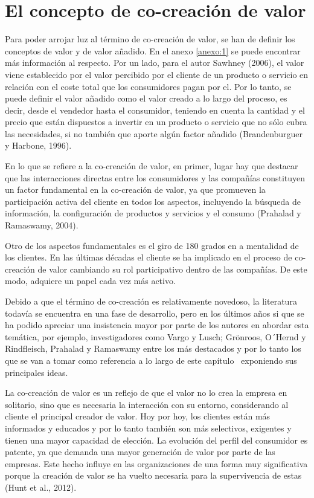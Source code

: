\section{El concepto de co-creación de valor} 

Para poder arrojar luz al término de co-creación de valor, se han de definir los conceptos de valor y de valor añadido. En el anexo \ref{anexo:1} se puede encontrar más información al respecto. Por un lado, para el autor Sawhney (2006), el valor viene establecido por el valor percibido por el cliente de un producto o servicio en relación con el coste total que los consumidores pagan por el. Por lo tanto, se puede definir el valor añadido como el valor creado a lo largo del proceso, es decir, desde el vendedor hasta el consumidor, teniendo en cuenta la cantidad y el precio que están dispuestos a invertir en un producto o servicio que no sólo cubra las necesidades, si no también que aporte algún factor añadido (Brandenburguer y Harbone, 1996). 


En lo que se refiere a la co-creación de valor, en primer, lugar hay que destacar que las interacciones directas entre los consumidores y las compañías constituyen un factor fundamental en la co-creación de valor, ya que promueven la participación activa del cliente en todos los aspectos, incluyendo la búsqueda de información, la configuración de productos y servicios y el consumo (Prahalad y Ramaswamy, 2004).

Otro de los aspectos fundamentales es el giro de 180 grados en a mentalidad de los clientes. En las últimas décadas el cliente se ha implicado en el proceso de co-creación de valor cambiando su rol participativo dentro de las compañías. De este modo, adquiere un papel cada vez más activo. 

Debido a que el término de co-creación es relativamente novedoso, la literatura todavía se encuentra en una fase de desarrollo, pero en los últimos años si que se ha podido apreciar una insistencia mayor por parte de los autores en abordar esta temática, por ejemplo, investigadores como Vargo y Lusch; Grönroos, O´Hernd y Rindfleisch, Prahalad y Ramaswamy entre los más destacados y por lo tanto los que se van a tomar como referencia a lo largo de este capítulo  exponiendo sus principales ideas.

La co-creación de valor es un reflejo de que el valor no lo crea la empresa en solitario, sino que es necesaria la interacción con su entorno, considerando al cliente el principal creador de valor. Hoy por hoy, los clientes están más informados y educados y por lo tanto también son más selectivos, exigentes y tienen una mayor capacidad de elección. La evolución del perfil del consumidor es patente, ya que demanda una mayor generación de valor por parte de las empresas. Este hecho influye en las organizaciones de una forma muy significativa porque la creación de valor se ha vuelto necesaria para la supervivencia de estas (Hunt et al., 2012).

